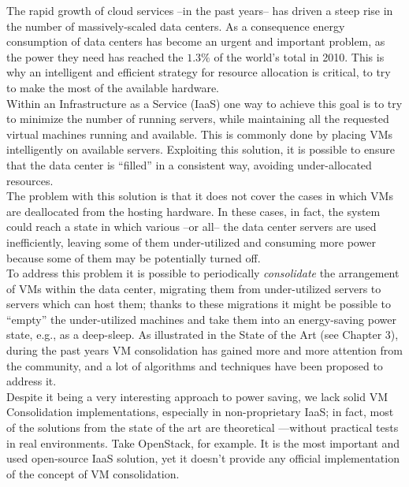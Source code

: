 

The rapid growth of cloud services --in the past years-- has driven a steep rise in the number of massively-scaled data centers. As a consequence energy consumption of data centers has become an urgent and important problem, as the power they need has reached the $1.3\%$ of the world’s total in 2010\cite{Koomey:2011vr}. This is why an intelligent and efficient strategy for resource allocation is critical, to try to make the most of the available hardware.\\
Within an Infrastructure as a Service (IaaS) one way to achieve this goal is to try to minimize the number of running servers, while maintaining all the requested virtual machines running and available. This is commonly done by placing VMs intelligently on available servers. Exploiting this solution, it is possible to ensure that the data center is ``filled'' in a consistent way, avoiding under-allocated resources.\\
The problem with this solution is that it does not cover the cases in which VMs are deallocated from the hosting hardware. In these cases, in fact, the system could reach a state in which various --or all-- the data center servers are used inefficiently, leaving some of them under-utilized and consuming more power because some of them may be potentially turned off.\\
To address this problem it is possible to periodically \textit{consolidate} the arrangement of VMs within the data center, migrating them from under-utilized servers to servers which can host them; thanks to these migrations it might be possible to ``empty'' the under-utilized machines and take them into an energy-saving power state, e.g., as a deep-sleep. As illustrated in the State of the Art (see Chapter 3), during the past years VM consolidation has gained more and more attention from the community, and a lot of algorithms and techniques have been proposed to address it.\\
Despite it being a very interesting approach to power saving, we lack solid VM Consolidation implementations, especially in non-proprietary IaaS; in fact, most of the solutions from the state of the art are theoretical ---without practical tests in real environments. Take OpenStack, for example. It is the most important and used open-source IaaS solution, yet it doesn’t provide any official implementation of the concept of VM consolidation.\\
